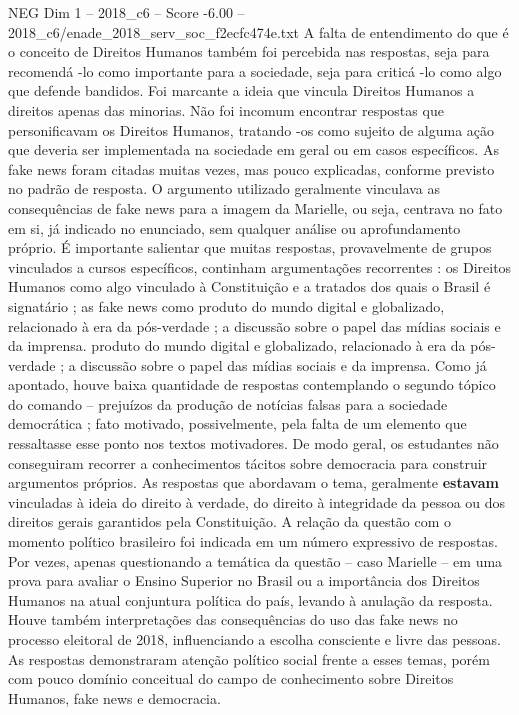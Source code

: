 \begin{textsample}{NEG Dim 1 – 2018\_c6 – Score -6.00 – 2018\_c6/enade\_2018\_serv\_soc\_f2ecfc474e.txt}
A falta de entendimento do que é o conceito de Direitos Humanos também foi percebida nas respostas, seja para recomendá -lo como importante para a sociedade, seja para criticá -lo como algo que defende bandidos.
Foi marcante a ideia que vincula Direitos Humanos a direitos apenas das minorias.
Não foi incomum encontrar respostas que personificavam os Direitos Humanos, tratando -os como sujeito de alguma ação que deveria ser implementada na sociedade em geral ou em casos específicos.
As fake news foram citadas muitas vezes, mas pouco explicadas, conforme previsto no padrão de resposta.
O argumento utilizado geralmente vinculava as consequências de fake news para a imagem da Marielle, ou seja, centrava no fato em si, já indicado no enunciado, sem qualquer análise ou aprofundamento próprio.
É importante salientar que muitas respostas, provavelmente de grupos vinculados a cursos específicos, continham argumentações recorrentes : os Direitos Humanos como algo vinculado à Constituição e a tratados dos quais o Brasil é signatário ; as fake news como produto do mundo digital e globalizado, relacionado à era da pós-verdade ; a discussão sobre o papel das mídias sociais e da imprensa. produto do mundo digital e globalizado, relacionado à era da pós-verdade ; a discussão sobre o papel das mídias sociais e da imprensa.
Como já apontado, houve baixa quantidade de respostas contemplando o segundo tópico do comando – prejuízos da produção de notícias falsas para a sociedade democrática ; fato motivado, possivelmente, pela falta de um elemento que ressaltasse esse ponto nos textos motivadores.
De modo geral, os estudantes não conseguiram recorrer a conhecimentos tácitos sobre democracia para construir argumentos próprios.
As respostas que abordavam o tema, geralmente \textbf{estavam} vinculadas à ideia do direito à verdade, do direito à integridade da pessoa ou dos direitos gerais garantidos pela Constituição.
A relação da questão com o momento político brasileiro foi indicada em um número expressivo de respostas.
Por vezes, apenas questionando a temática da questão – caso Marielle – em uma prova para avaliar o Ensino Superior no Brasil ou a importância dos Direitos Humanos na atual conjuntura política do país, levando à anulação da resposta.
Houve também interpretações das consequências do uso das fake news no processo eleitoral de 2018, influenciando a escolha consciente e livre das pessoas.
As respostas demonstraram atenção político social frente a esses temas, porém com pouco domínio conceitual do campo de conhecimento sobre Direitos Humanos, fake news e democracia.

\end{textsample}
